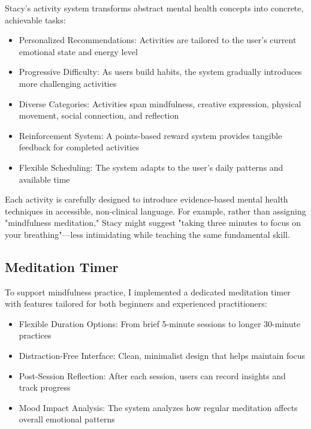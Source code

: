 \documentclass[12pt]{article}
\begin{document}
Stacy's activity system transforms abstract mental health concepts into concrete, achievable tasks:

\begin{itemize}
    \item Personalized Recommendations: Activities are tailored to the user's current emotional state and energy level
    \item Progressive Difficulty: As users build habits, the system gradually introduces more challenging activities
    \item Diverse Categories: Activities span mindfulness, creative expression, physical movement, social connection, and reflection
    \item Reinforcement System: A points-based reward system provides tangible feedback for completed activities
    \item Flexible Scheduling: The system adapts to the user's daily patterns and available time
\end{itemize}

Each activity is carefully designed to introduce evidence-based mental health techniques in accessible, non-clinical language. For example, rather than assigning "mindfulness meditation," Stacy might suggest "taking three minutes to focus on your breathing"—less intimidating while teaching the same fundamental skill.

\subsection{Meditation Timer}

To support mindfulness practice, I implemented a dedicated meditation timer with features tailored for both beginners and experienced practitioners:

\begin{itemize}
    \item Flexible Duration Options: From brief 5-minute sessions to longer 30-minute practices
    \item Distraction-Free Interface: Clean, minimalist design that helps maintain focus
    \item Post-Session Reflection: After each session, users can record insights and track progress
    \item Mood Impact Analysis: The system analyzes how regular meditation affects overall emotional patterns
\end{itemize}
\end{document}
